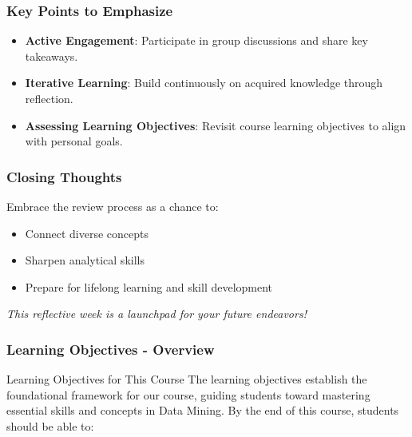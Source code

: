 \documentclass[aspectratio=169]{beamer}
\begin{document}
\begin{frame}[fragile]
    \frametitle{Key Points to Emphasize}
    \begin{itemize}
        \item \textbf{Active Engagement}: Participate in group discussions and share key takeaways.
        \item \textbf{Iterative Learning}: Build continuously on acquired knowledge through reflection.
        \item \textbf{Assessing Learning Objectives}: Revisit course learning objectives to align with personal goals.
    \end{itemize}
\end{frame}

\begin{frame}[fragile]
    \frametitle{Closing Thoughts}
    Embrace the review process as a chance to:
    \begin{itemize}
        \item Connect diverse concepts
        \item Sharpen analytical skills
        \item Prepare for lifelong learning and skill development
    \end{itemize}
    \vspace{0.5cm}
    \textit{This reflective week is a launchpad for your future endeavors!}
\end{frame}

\begin{frame}[fragile]
    \frametitle{Learning Objectives - Overview}
    \begin{block}{Learning Objectives for This Course}
        The learning objectives establish the foundational framework for our course, guiding students toward mastering essential skills and concepts in Data Mining. By the end of this course, students should be able to:
    \end{block}
\end{frame}
\end{document}
